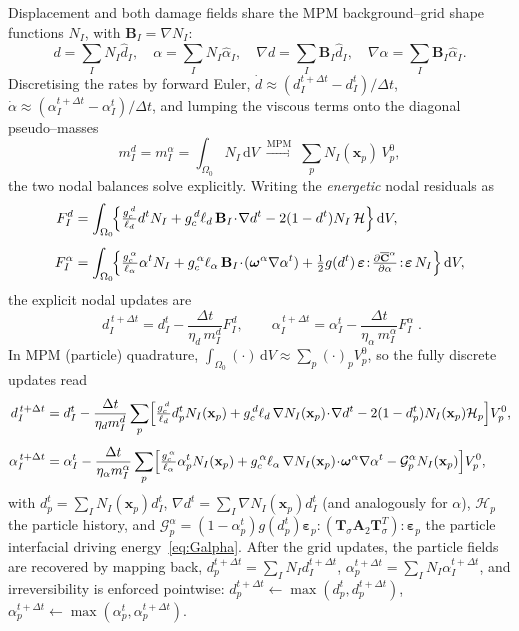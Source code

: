 \documentclass[12pt,a4paper]{article}
\newcommand{\beps}{\boldsymbol{\varepsilon}}
\newcommand{\bB}{\mathbf{B}}
\newcommand{\bx}{\mathbf{x}}
\newcommand{\bomega}{\boldsymbol{\omega}}
\newcommand{\Ca}{\overline{\mathbf{C}}^{\alpha}}     %
\newcommand{\Tsig}{\mathbf{T}_{\!\sigma}}            %
\newcommand{\dd}{\,\mathrm{d}}
\newcommand{\Dt}{\Delta t}
\begin{document}
	Displacement and both damage fields share the MPM background--grid shape
	functions $N_I$, with $\bB_I=\nabla N_I$:
	\begin{equation}\label{eq:interp}
		d=\sum_I N_I\hat d_I,\quad \alpha=\sum_I N_I\hat\alpha_I,\quad
		\nabla d=\sum_I\bB_I\hat d_I,\quad \nabla\alpha=\sum_I\bB_I\hat\alpha_I.
	\end{equation}
	Discretising the rates by forward Euler,
	$\dot d\approx(d_I^{t+\Dt}-d_I^{t})/\Dt$,
	$\dot\alpha\approx(\alpha_I^{t+\Dt}-\alpha_I^{t})/\Dt$, and lumping the viscous
	terms onto the diagonal pseudo--masses
	\begin{equation}\label{eq:pseudomass}
		m_I^{d}=m_I^{\alpha}=\int_{\Omega_0}N_I\dd V \;\xrightarrow{\text{MPM}}\;
		\sum_p N_I(\bx_p)\,V_p^0,
	\end{equation}
	the two nodal balances solve explicitly. Writing the \emph{energetic} nodal
	residuals as
	\begin{align}
		F_I^{d} &= \int_{\Omega_0}\!\Bigl\{\tfrac{g_c^{\,d}}{\ell_d}d^{t}N_I
		+ g_c^{\,d}\ell_d\,\bB_I\!\cdot\!\nabla d^{t}
		- 2(1-d^{t})N_I\,\mathcal{H}\Bigr\}\dd V, \label{eq:Fd}\\[4pt]
		F_I^{\alpha} &= \int_{\Omega_0}\!\Bigl\{\tfrac{g_c^{\,\alpha}}{\ell_\alpha}\alpha^{t}N_I
		+ g_c^{\,\alpha}\ell_\alpha\,\bB_I\!\cdot\!(\bomega^{\alpha}\nabla\alpha^{t})
		+ \tfrac12 g(d^{t})\,\beps\!:\!\tfrac{\partial\Ca}{\partial\alpha}\!:\!\beps\,N_I\Bigr\}\dd V, \label{eq:Fa}
	\end{align}
	the explicit nodal updates are
	\begin{equation}\label{eq:nodal_update}
		\boxed{\;
		d_I^{\,t+\Dt}=d_I^{t}-\frac{\Dt}{\eta_d\,m_I^{d}}F_I^{d},
		\qquad
		\alpha_I^{\,t+\Dt}=\alpha_I^{t}-\frac{\Dt}{\eta_\alpha\,m_I^{\alpha}}F_I^{\alpha}\;.}
	\end{equation}
	In MPM (particle) quadrature, $\int_{\Omega_0}(\cdot)\dd V\approx\sum_p(\cdot)_p V_p^0$,
	so the fully discrete updates read
	\begin{align}
		d_I^{\,t+\Dt} &= d_I^{t}-\frac{\Dt}{\eta_d m_I^{d}}\sum_p\Bigl[
		\tfrac{g_c^{\,d}}{\ell_d}d_p^{t}N_I(\bx_p)
		+ g_c^{\,d}\ell_d\,\nabla N_I(\bx_p)\!\cdot\!\nabla d^{t}
		- 2(1-d_p^{t})N_I(\bx_p)\mathcal{H}_p\Bigr]V_p^0, \label{eq:dupd_mpm}\\[4pt]
		\alpha_I^{\,t+\Dt} &= \alpha_I^{t}-\frac{\Dt}{\eta_\alpha m_I^{\alpha}}\sum_p\Bigl[
		\tfrac{g_c^{\,\alpha}}{\ell_\alpha}\alpha_p^{t}N_I(\bx_p)
		+ g_c^{\,\alpha}\ell_\alpha\,\nabla N_I(\bx_p)\!\cdot\!\bomega^{\alpha}\nabla\alpha^{t}
		- \mathcal{G}^{\alpha}_p N_I(\bx_p)\Bigr]V_p^0, \label{eq:aupd_mpm}
	\end{align}
	with $d_p^{t}=\sum_I N_I(\bx_p)d_I^{t}$, $\nabla d^{t}=\sum_I\nabla N_I(\bx_p)d_I^{t}$
	(and analogously for $\alpha$), $\mathcal{H}_p$ the particle history,
	and $\mathcal{G}^{\alpha}_p=(1-\alpha_p^{t})g(d_p^{t})\beps_p:(\Tsig\mathbf{A}_2\Tsig^{T}):\beps_p$
	the particle interfacial driving energy~\eqref{eq:Galpha}. After the grid
	updates, the particle fields are recovered by mapping back,
	$d_p^{t+\Dt}=\sum_I N_I d_I^{t+\Dt}$,
	$\alpha_p^{t+\Dt}=\sum_I N_I \alpha_I^{t+\Dt}$, and irreversibility is enforced
	pointwise: $d_p^{t+\Dt}\!\leftarrow\!\max(d_p^{t},d_p^{t+\Dt})$,
	$\alpha_p^{t+\Dt}\!\leftarrow\!\max(\alpha_p^{t},\alpha_p^{t+\Dt})$.
\end{document}
